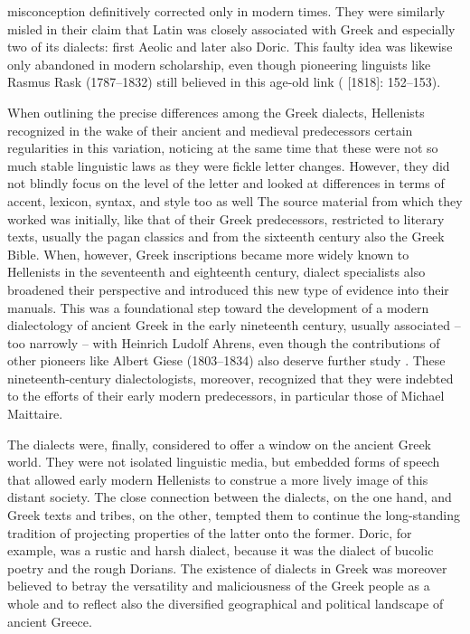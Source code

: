 misconception definitively corrected only in modern times. They were similarly misled in their claim that Latin was closely associated with Greek and especially two of its dialects: first Aeolic and later also Doric. This faulty idea was likewise only abandoned in modern scholarship, even though pioneering linguists like Rasmus Rask (1787–1832) still believed in this age-old link (\citealt{Rask2013} [1818]: 152–153).

When outlining the precise differences among the Greek dialects, Hellenists recognized in the wake of their ancient and medieval predecessors certain regularities in this variation, noticing at the same time that these were not so much stable linguistic laws as they were fickle letter changes. However, they did not blindly focus on the level of the letter and looked at differences in terms of accent, lexicon, syntax, and style too as well The source material from which they worked was initially, like that of their Greek predecessors, restricted to literary texts, usually the pagan classics and from the sixteenth century also the Greek Bible. When, however, Greek inscriptions became more widely known to Hellenists in the seventeenth and eighteenth century, dialect specialists also broadened their perspective and introduced this new type of evidence into their manuals. This was a foundational step toward the development of a modern dialectology of ancient Greek in the early nineteenth century, usually associated – too narrowly – with Heinrich Ludolf Ahrens, even though the contributions of other pioneers like Albert Giese (1803–1834) also deserve further study \citep{Giese1837}. These nineteenth-century dialectologists, moreover, recognized that they were indebted to the efforts of their early modern predecessors, in particular those of Michael Maittaire.

The dialects were, finally, considered to offer a window on the ancient Greek world. They were not isolated linguistic media, but embedded forms of speech that allowed early modern Hellenists to construe a more lively image of this distant society. The close connection between the dialects, on the one hand, and Greek texts and tribes, on the other, tempted them to continue the long-standing tradition of projecting properties of the latter onto the former. Doric, for example, was a rustic and harsh dialect, because it was the dialect of bucolic poetry and the rough Dorians. The existence of dialects in Greek was moreover believed to betray the versatility and maliciousness of the Greek people as a whole and to reflect also the diversified geographical and political landscape of ancient Greece.

